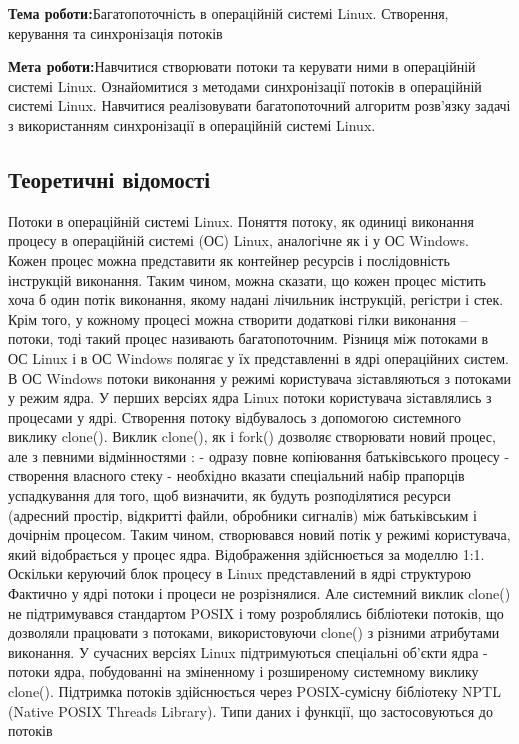 \documentclass[12pt]{extarticle}
\begin{document}
\textbf{Тема роботи:}Багатопоточність в операційній системі Linux. Створення,
керування та синхронізація потоків
\vspace{12pt}

\textbf{Мета роботи:}Навчитися створювати потоки та керувати ними в операційній
системі Linux. Ознайомитися з методами синхронізації потоків в операційній
системі Linux. Навчитися реалізовувати багатопоточний алгоритм розв’язку
задачі з використанням синхронізації в операційній системі Linux.

\subsection*{Теоретичні відомості}
Потоки в операційній системі Linux. Поняття потоку, як одиниці
виконання процесу в операційній системі (ОС) Linux, аналогічне як і у ОС
Windows. Кожен процес можна представити як контейнер ресурсів і
послідовність інструкцій виконання. Таким чином, можна сказати, що кожен
процес містить хоча б один потік виконання, якому надані лічильник
інструкцій, регістри і стек. Крім того, у кожному процесі можна створити
додаткові гілки виконання – потоки, тоді такий процес називають
багатопоточним.
Різниця між потоками в ОС Linux і в ОС Windows полягає у їх
представленні в ядрі операційних систем. В ОС Windows потоки виконання у
режимі користувача зіставляються з потоками у режим ядра. У перших версіях
ядра Linux потоки користувача зіставлялись з процесами у ядрі. Створення
потоку відбувалось з допомогою системного виклику clone(). Виклик clone(), як
і fork() дозволяє створювати новий процес, але з певними відмінностями :
- одразу повне копіювання батьківського процесу
- створення власного стеку
- необхідно вказати спеціальний набір прапорців успадкування для того,
щоб визначити, як будуть розподілятися ресурси (адресний простір, відкритті
файли, обробники сигналів) між батьківським і дочірнім процесом.
Таким чином, створювався новий потік у режимі користувача, який
відобрається у процес ядра. Відображення здійснюється за моделлю 1:1.
Оскільки керуючий блок процесу в Linux представлений в ядрі структурою
Фактично у ядрі потоки і процеси не розрізнялися. Але системний виклик
clone() не підтримувався стандартом POSIX і тому розроблялись бібліотеки
потоків, що дозволяли працювати з потоками, використовуючи clone() з
різними атрибутами виконання.
У сучасних версіях Linux підтримуються спеціальні об'єкти ядра - потоки
ядра, побудованні на зміненному і розширеному системному виклику clone().
Підтримка потоків здійснюється через POSIX-сумісну бібліотеку NPTL (Native
POSIX Threads Library). Типи даних і функції, що застосовуються до потоків
\end{document}
